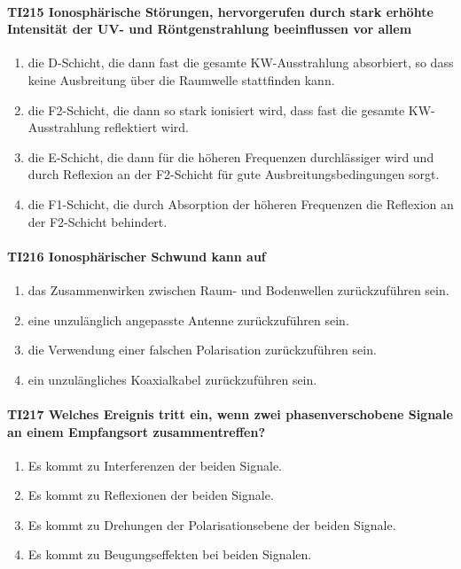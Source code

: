 \documentclass[8pt]{article}
\begin{document}
\paragraph*{TI215 Ionosphärische Störungen, hervorgerufen durch stark erhöhte Intensität der UV- und Röntgenstrahlung beeinflussen vor allem} 
\begin{enumerate}[nolistsep,label=\Alph*]
\item die D-Schicht, die dann fast die gesamte KW-Ausstrahlung absorbiert, so dass keine Ausbreitung über die Raumwelle stattfinden kann.
\item die F2-Schicht, die dann so stark ionisiert wird, dass fast die gesamte KW-Ausstrahlung reflektiert wird.
\item die E-Schicht, die dann für die höheren Frequenzen durchlässiger wird und durch Reflexion an der F2-Schicht für gute Ausbreitungsbedingungen sorgt.
\item die F1-Schicht, die durch Absorption der höheren Frequenzen die Reflexion an der F2-Schicht behindert.
\end{enumerate}

\paragraph*{TI216 Ionosphärischer Schwund kann auf} 
\begin{enumerate}[nolistsep,label=\Alph*]
\item das Zusammenwirken zwischen Raum- und Bodenwellen zurückzuführen sein.
\item eine unzulänglich angepasste Antenne zurückzuführen sein.
\item die Verwendung einer falschen Polarisation zurückzuführen sein.
\item ein unzulängliches Koaxialkabel zurückzuführen sein.
\end{enumerate}

\paragraph*{TI217 Welches Ereignis tritt ein, wenn zwei phasenverschobene Signale an einem Empfangsort zusammentreffen?}
\begin{enumerate}[nolistsep,label=\Alph*]
\item Es kommt zu Interferenzen der beiden Signale.
\item Es kommt zu Reflexionen der beiden Signale.
\item Es kommt zu Drehungen der Polarisationsebene der beiden Signale.
\item Es kommt zu Beugungseffekten bei beiden Signalen.
\end{enumerate}
\end{document}
